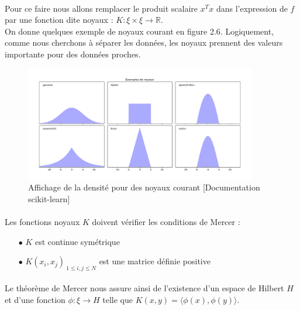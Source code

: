 \documentclass[a4paper,12pt,titlepage]{report}
\begin{document}
\paragraph{}
Pour ce faire nous allons remplacer le produit scalaire $x^T x$ dans l'expression de $f$ par une fonction dite \og noyaux \fg : $K : \xi \times \xi \rightarrow \mathbb{R}$. \\
On donne quelques exemple de noyaux courant en figure 2.6. Logiquement, comme nous cherchons à séparer les données, les noyaux prennent des valeurs importante pour des données proches.

\begin{figure}[!h]
	\begin{center}
		\includegraphics[height = 5cm, keepaspectratio]{graphes/exemple_noyaux.png}
		\caption{Affichage de la densité pour des noyaux courant [Documentation scikit-learn]}
	\end{center}
\end{figure}

\paragraph{}
Les fonctions noyaux $K$ doivent vérifier les conditions de Mercer :
\begin{itemize}
\item[$\bullet$]  $K$ est continue symétrique 
\item[$\bullet$]  $K(x_i,x_j)_{\ 1 \leqslant i,j \leqslant N}$ est une matrice définie positive
\end{itemize}
\paragraph{}
Le théorème de Mercer nous assure ainsi de l'existence d'un espace de Hilbert $H$ et d'une fonction $\phi :\xi \rightarrow H$ telle que $K(x,y) = \langle\phi(x),\phi(y)\rangle$.
\end{document}
